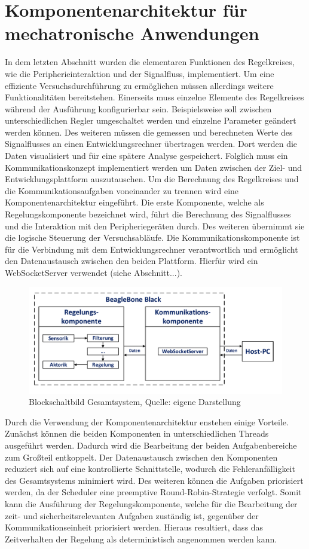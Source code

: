 \section{Komponentenarchitektur für mechatronische Anwendungen}
In dem letzten Abschnitt wurden die elementaren Funktionen des Regelkreises, wie die Peripherieinteraktion und der Signalfluss, implementiert. Um eine effiziente Versuchsdurchführung zu ermöglichen müssen allerdings weitere Funktionalitäten bereitstehen. Einerseits muss einzelne Elemente des Regelkreises während der Ausführung konfigurierbar sein. Beispielsweise soll zwischen unterschiedlichen Regler umgeschaltet werden und einzelne Parameter geändert werden können. Des weiteren müssen die gemessen und berechneten Werte des Signalflusses an einen Entwicklungsrechner übertragen werden. Dort werden die Daten visualisiert und für eine spätere Analyse gespeichert.
Folglich muss ein Kommunikationskonzept implementiert werden um Daten zwischen der Ziel- und Entwicklungsplattform auszutauschen. Um die Berechnung des Regelkreises und die Kommunikationsaufgaben voneinander zu trennen wird eine Komponentenarchitektur eingeführt. Die erste Komponente, welche als Regelungskomponente bezeichnet wird, führt die Berechnung des Signalflusses und die Interaktion mit den Peripheriegeräten durch. Des weiteren übernimmt sie die logische Steuerung der Versuchsabläufe. Die Kommunikationskomponente ist für die Verbindung mit dem Entwicklungsrechner verantwortlich und ermöglicht den Datenaustausch zwischen den beiden Plattform. Hierfür wird ein WebSocketServer verwendet (siehe Abschnitt...).
\begin{figure}[!h]
\centering
\includegraphics[width=\linewidth]{img/SW_1_KA_BSB.pdf}
\caption{Blockschaltbild Gesamtsystem, Quelle: eigene Darstellung}
\end{figure}
Durch die Verwendung der Komponentenarchitektur enstehen einige Vorteile. Zunächst können die beiden Komponenten in unterschiedlichen Threads ausgeführt werden. Dadurch wird die Bearbeitung der beiden Aufgabenbereiche zum Großteil entkoppelt. Der Datenaustausch zwischen den Komponenten reduziert sich auf eine kontrollierte Schnittstelle, wodurch die Fehleranfälligkeit des Gesamtsystems minimiert wird. Des weiteren können die Aufgaben priorisiert werden, da der Scheduler eine preemptive Round-Robin-Strategie verfolgt. Somit kann die Ausführung der Regelungskomponente, welche für die Bearbeitung der zeit- und sicherheitsrelevanten Aufgaben zuständig ist, gegenüber der Kommunikationseinheit priorisiert werden. Hieraus resultiert, dass das Zeitverhalten der Regelung als deterministisch angenommen werden kann. 


